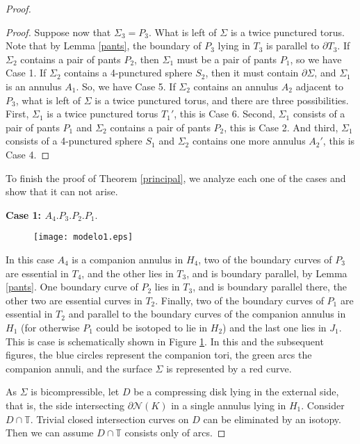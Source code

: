 \documentclass[12pt]{amsart}
\begin{document}
\begin{proof}
\begin{proof}
Suppose now that $\Sigma_3=P_3$. What is left of $\Sigma$ is a twice punctured torus. Note that by Lemma \ref{pants}, the boundary of $P_3$ lying in $T_3$ is parallel to $\partial T_3$. If $\Sigma_2$ contains a pair of pants $P_2$, then $\Sigma_1$ must be a pair of pants $P_1$, so we have Case 1. If $\Sigma_2$ contains a 4-punctured sphere $S_2$, then it must contain $\partial \Sigma$, and $\Sigma_1$ is an annulus $A_1$. So, we have Case 5. If $\Sigma_2$ contains an annulus $A_2$ adjacent to $P_3$, what is left of $\Sigma$ is a twice punctured torus, and there are three possibilities. First, $\Sigma_1$ is a twice punctured torus $T_1'$, this is Case 6. Second, $\Sigma_1$ consists of a pair of pants $P_1$ and $\Sigma_2$ contains a pair of pants $P_2$, this is Case 2. And third, $\Sigma_1$ consists of a 4-punctured sphere $S_1$ and $\Sigma_2$ contains one more annulus $A_2'$, this is Case 4.
 \end{proof}


To finish the proof of Theorem \ref{principal}, we analyze each one of the cases and show that it can not arise.

\vskip10pt
\textbf{Case 1: $A_4.P_3.P_2.P_1$}.

\begin{figure}
\begin{center}
\texttt{[image: modelo1.eps]}
\end{center}
\caption{}
\label{case1}
\end{figure}

In this case $A_4$ is a companion annulus in $H_4$, two of the boundary curves of $P_3$ are essential in $T_4$, and the other lies in $T_3$, and is boundary parallel, by Lemma \ref{pants}. One boundary curve of $P_2$ lies in $T_3$, and is boundary parallel there, the other two are essential curves in $T_2$. Finally, two of the boundary curves of $P_1$ are essential in $T_2$ and parallel to the boundary curves of the companion annulus in $H_1$ (for otherwise $P_1$ could be isotoped to lie in $H_2$) and the last one lies in $J_1$. This is case is schematically shown in Figure \ref{case1}. In this and the subsequent figures, the blue circles represent the companion tori, the green arcs the companion annuli, and the surface $\Sigma$ is represented by a red curve.

As $\Sigma$ is bicompressible, let $D$ be a compressing disk lying in the external side, that is, the side intersecting $\partial \mathcal{N}(K)$ in a single annulus lying in $H_1$. Consider $D\cap\mathbb{T}$.
Trivial closed intersection curves on $D$ can be eliminated by an isotopy. Then we can assume $D\cap\mathbb{T}$ consists only of arcs.



\end{proof}
\end{document}
